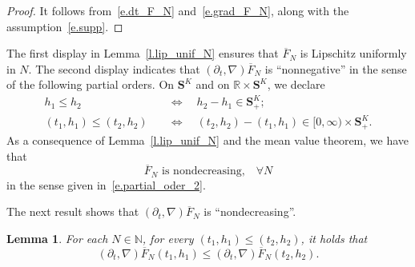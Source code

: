 \documentclass[10pt]{amsart}
\newtheorem{lemm}[theo]{Lemma}\newtheorem{prop}[theo]{Proposition}\newtheorem{coro}[theo]{Corollary}\newtheorem{conj}[theo]{Conjecture}
\theoremstyle{definition}\newtheorem{defi}[theo]{Definition}\newtheorem{rema}[theo]{Remark}\newtheorem{exam}[theo]{Example}\newtheorem{exem}[theo]{Example}\newtheorem{nota}[theo]{Notation}
\newcommand{\N}{\mathbb{N}}
\newcommand{\R}{\mathbb{R}}
\renewcommand{\S}{\mathbf{S}}
\renewcommand{\leq}{\leqslant}
\renewcommand{\bar}{\overline}
\let\oldforall\forall
\renewcommand*{\forall}{\mathrel{\oldforall}}
\begin{document}
\begin{proof}
It follows from~\eqref{e.dt_F_N} and~\eqref{e.grad_F_N}, along with the assumption~\eqref{e.supp}.
\end{proof}


The first display in Lemma~\ref{l.lip_unif_N} ensures that $\bar F_N$ is Lipschitz uniformly in $N$. The second display indicates that $(\partial_t, \nabla)\bar F_N$ is ``nonnegative'' in the sense of the following partial orders. On $\S^K$ and on $\R\times \S^K$, we declare
\begin{align}
h_1 \leq h_2 \quad&\Longleftrightarrow\quad h_2 - h_1 \in \S^K_+;\label{e.partial_oder_1}
\\
\left(t_1, h_1\right)\leq \left(t_2,h_2\right) \quad&\Longleftrightarrow\quad \left(t_2,h_2\right)-\left(t_1, h_1\right)\in [0,\infty)\times \S^K_+.\label{e.partial_oder_2}
\end{align}
{As a consequence of Lemma~\ref{l.lip_unif_N} and the mean value theorem, we have that
\begin{equation}\label{e.bar_F_nondec}
\bar F_N\text{ is nondecreasing,}\quad\forall N
\end{equation}
in the sense given in~\eqref{e.partial_oder_2}.}

The next result shows that $(\partial_t, \nabla)\bar F_N$ is ``nondecreasing''.



\begin{lemm}\label{l.F_N.order}
For each $N\in\N$, for every $(t_1,h_1)\leq (t_2,h_2)$, it holds that
\begin{equation*}
\left(\partial_t,\nabla\right)\bar F_N \left(t_1,h_1\right)\leq \left(\partial_t,\nabla\right)\bar F_N\left(t_2,h_2\right).
\end{equation*}
\end{lemm}
\end{document}
